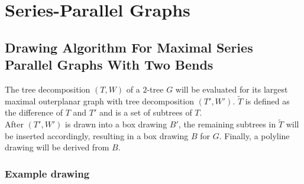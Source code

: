 \section{Series-Parallel Graphs}\label{section:SP-graphs}



\subsection{Drawing Algorithm For Maximal Series Parallel Graphs With Two Bends}

The tree decomposition $(T,W)$ of a $2$-tree $G$ will be evaluated for its largest maximal outerplanar graph with tree decomposition $(T',W')$. $\tilde{T}$ is defined as the difference of $T$ and $T'$ and is a set of subtrees of $T$.\\
After $(T',W')$ is drawn into a box drawing $B'$, the remaining subtrees in $\tilde{T}$ will be inserted accordingly, resulting in a box drawing $B$ for $G$. Finally, a polyline drawing will be derived from $B$.



\subsubsection{Example drawing}
